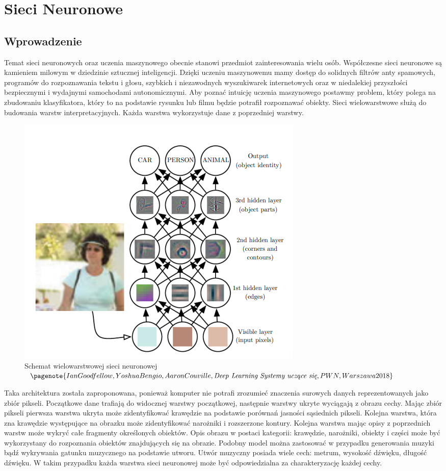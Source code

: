 \chapter{Sieci Neuronowe}

\section{Wprowadzenie}

Temat sieci neuronowych oraz uczenia maszynowego obecnie stanowi przedmiot zainteresowania wielu osób. Współczesne sieci neuronowe są kamieniem milowym w dziedzinie sztucznej inteligencji. Dzięki uczeniu maszynowemu mamy dostęp do solidnych filtrów anty spamowych, programów do rozpoznawania tekstu i głosu, szybkich i niezawodnych wyszukiwarek internetowych oraz w niedalekiej przyszłości bezpiecznymi i wydajnymi samochodami autonomicznymi. Aby poznać intuicję uczenia maszynowego postawmy problem, który polega na zbudowaniu klasyfikatora, który to na podstawie rysunku lub filmu będzie potrafił rozpoznawać obiekty. Sieci wielowarstwowe służą do budowania warstw interpretacyjnych. Każda warstwa wykorzystuje dane z poprzedniej warstwy.

\begin{figure}[H]
	\centering
	\includegraphics[width=0.5\linewidth]{deep_network}
	\caption{Schemat wielowarstwowej sieci neuronowej $\pagenote{Ian Goodfellow, Yoshua Bengio, Aaron Couville, \textit{Deep Learning Systemy uczące się}, PWN, Warszawa 2018}$}
	\label{fig:deepnetwork}
\end{figure}

Taka architektura została zaproponowana, ponieważ komputer nie potrafi zrozumieć znaczenia surowych danych reprezentowanych jako zbiór pikseli. Początkowe dane trafiają do widocznej warstwy początkowej, następnie warstwy ukryte wyciągają z obrazu cechy. Mając zbiór pikseli pierwsza warstwa ukryta może zidentyfikować krawędzie na podstawie porównań jasności sąsiednich pikseli. Kolejna warstwa, która zna krawędzie występujące na obrazku może zidentyfikować narożniki i rozszerzone kontury. Kolejna warstwa mając opisy z poprzednich warstw może wykryć całe fragmenty określonych obiektów. Opis obrazu w postaci kategorii: krawędzie, narożniki, obiekty i części może być wykorzystany do rozpoznania obiektów znajdujących się na obrazie. Podobny model można zastosować w przypadku generowania muzyki bądź wykrywania gatunku muzycznego na podstawie utworu. Utwór muzyczny posiada wiele cech: metrum, wysokość dźwięku, długość dźwięku. W takim przypadku każda warstwa sieci neuronowej może być odpowiedzialna za charakteryzację każdej cechy.

